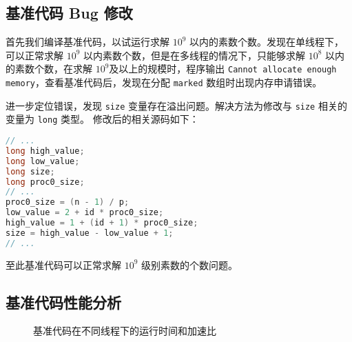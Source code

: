 \documentclass[11pt]{article}
\begin{document}
  \subsection{基准代码 Bug 修改}
  首先我们编译基准代码，以试运行求解 $10^9$ 以内的素数个数。发现在单线程下，可以正常求解 $10^9$ 以内素数个数，但是在多线程的情况下，只能够求解 $10^8$ 以内的素数个数，在求解 $10^9$及以上的规模时，程序输出 \lstinline{Cannot allocate enough memory}，查看基准代码后，发现在分配 \verb|marked| 数组时出现内存申请错误。

  进一步定位错误，发现 \verb|size| 变量存在溢出问题。解决方法为修改与 \verb|size| 相关的变量为 \verb|long| 类型。 修改后的相关源码如下：
  \begin{file}
    \begin{lstlisting}[language=C++]
// ...
long high_value; 
long low_value;
long size;
long proc0_size;
// ...
proc0_size = (n - 1) / p;
low_value = 2 + id * proc0_size;
high_value = 1 + (id + 1) * proc0_size;
size = high_value - low_value + 1;
// ...
    \end{lstlisting}
  \end{file}

  至此基准代码可以正常求解 $10^9$ 级别素数的个数问题。

  \subsection{基准代码性能分析}
  \begin{figure}[h]
    \centering
    \label{fig:baseline}
    \caption{基准代码在不同线程下的运行时间和加速比}
  
  \end{figure}
\end{document}
